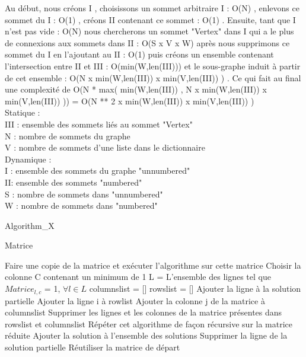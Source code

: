 \documentclass{article}
\begin{document}
Au début, nous créons I , choisissons un sommet 
arbitraire I : O(N) , enlevons ce sommet du I : O(1) ,
créons II contenant ce sommet : O(1) .
Ensuite, tant que I n'est pas vide : O(N) nous chercherons
un sommet "Vertex" dans I qui a le plus de connexions aux sommets 
dans II : O(S x V x W) après nous supprimons ce sommet du I en 
l'ajoutant au II : O(1) puis créons un ensemble contenant 
l'intersection entre II et III : O(min(W,len(III))) et le 
sous-graphe induit à partir de cet ensemble : 
O(N x min(W,len(III)) x min(V,len(III)) ) .
Ce qui fait au final une complexité de
        O(N * max( min(W,len(III)) , N x min(W,len(III)) x min(V,len(III)) ))
    =   O(N ** 2 x min(W,len(III)) x min(V,len(III)) )\\
    
Statique :\\
III : ensemble des sommets liés au sommet "Vertex"\\
N : nombre de sommets du graphe \\
V : nombre de sommets d'une liste dans le dictionnaire\\

Dynamique :\\
I : ensemble des sommets du graphe "unnumbered"\\
II: ensemble des sommets "numbered"\\
S : nombre de sommets dans "unnumbered"\\
W : nombre de sommets dans "numbered"\\
		
		
		\begin{algorithm}[H]
		\caption{Algorithm\_X}
		\begin{algorithmic}[1]
		\REQUIRE Matrice
		
		\STATE Faire une copie de la matrice et exécuter l'algorithme sur cette matrice		
		\STATE Choisir la colonne C contenant un minimum de 1
		\STATE L = L'ensemble des lignes tel que $Matrice_{l,c}$ = 1, $\forall l \in L$
			\STATE columnslist = []
			\STATE rowslist = []
			\STATE Ajouter la ligne à la solution partielle
							\STATE Ajouter la ligne i à rowlist
						\ENDIF									
					\ENDFOR
					\STATE Ajouter la colonne j de la matrice à columnslist	
				\ENDIF
			\ENDFOR
		\STATE Supprimer les lignes et les colonnes de la matrice présentes dans rowslist et columnslist
				\STATE Répéter cet algorithme de façon récursive sur la matrice réduite
			\ENDIF			
		\ELSE
			\STATE Ajouter la solution à l'ensemble des solutions
		\ENDIF 
		\STATE Supprimer la ligne de la solution partielle
		\STATE Réutiliser la matrice de départ
		\ENDFOR
	
		\end{algorithmic}
		\end{algorithm}
		
\end{document}
